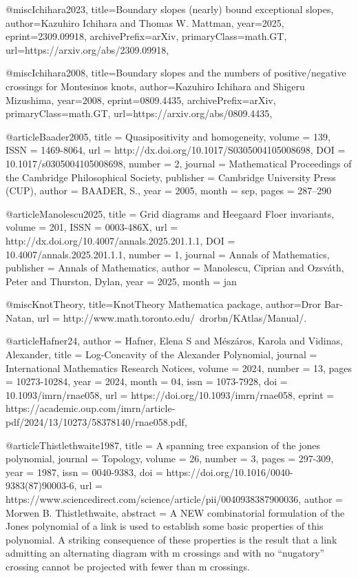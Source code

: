 @misc{Ichihara2023,
  title={Boundary slopes (nearly) bound exceptional slopes}, 
  author={Kazuhiro Ichihara and Thomas W. Mattman},
  year={2025},
  eprint={2309.09918},
  archivePrefix={arXiv},
  primaryClass={math.GT},
  url={https://arxiv.org/abs/2309.09918}, 
}

@misc{Ichihara2008,
  title={Boundary slopes and the numbers of positive/negative crossings for Montesinos knots}, 
  author={Kazuhiro Ichihara and Shigeru Mizushima},
  year={2008},
  eprint={0809.4435},
  archivePrefix={arXiv},
  primaryClass={math.GT},
  url={https://arxiv.org/abs/0809.4435}, 
}


@article{Baader2005,
  title = {Quasipositivity and homogeneity},
  volume = {139},
  ISSN = {1469-8064},
  url = {http://dx.doi.org/10.1017/S0305004105008698},
  DOI = {10.1017/s0305004105008698},
  number = {2},
  journal = {Mathematical Proceedings of the Cambridge Philosophical Society},
  publisher = {Cambridge University Press (CUP)},
  author = {BAADER,  S.},
  year = {2005},
  month = sep,
  pages = {287--290}
}

@article{Manolescu2025,
  title = {Grid diagrams and Heegaard Floer invariants},
  volume = {201},
  ISSN = {0003-486X},
  url = {http://dx.doi.org/10.4007/annals.2025.201.1.1},
  DOI = {10.4007/annals.2025.201.1.1},
  number = {1},
  journal = {Annals of Mathematics},
  publisher = {Annals of Mathematics},
  author = {Manolescu,  Ciprian and Ozsváth,  Peter and Thurston,  Dylan},
  year = {2025},
  month = jan 
}

@misc{KnotTheory,
  title={{KnotTheory} Mathematica package},
  author={Dror Bar-Natan},
  url = {http://www.math.toronto.edu/~drorbn/KAtlas/Manual/.}
}

@article{Hafner24,
  author = {Hafner, Elena S and Mészáros, Karola and Vidinas, Alexander},
  title = {Log-Concavity of the Alexander Polynomial},
  journal = {International Mathematics Research Notices},
  volume = {2024},
  number = {13},
  pages = {10273-10284},
  year = {2024},
  month = {04},
  issn = {1073-7928},
  doi = {10.1093/imrn/rnae058},
  url = {https://doi.org/10.1093/imrn/rnae058},
  eprint = {https://academic.oup.com/imrn/article-pdf/2024/13/10273/58378140/rnae058.pdf},
}

@article{Thistlethwaite1987,
  title = {A spanning tree expansion of the jones polynomial},
  journal = {Topology},
  volume = {26},
  number = {3},
  pages = {297-309},
  year = {1987},
  issn = {0040-9383},
  doi = {https://doi.org/10.1016/0040-9383(87)90003-6},
  url = {https://www.sciencedirect.com/science/article/pii/0040938387900036},
  author = {Morwen B. Thistlethwaite},
  abstract = {A NEW combinatorial formulation of the Jones polynomial of a link is used to establish some basic properties of this polynomial. A striking consequence of these properties is the result that a link admitting an alternating diagram with m crossings and with no “nugatory” crossing cannot be projected with fewer than m crossings.}
}

